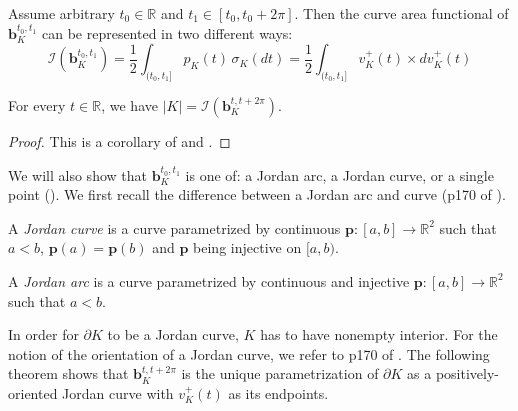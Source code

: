 \begin{theorem}

Assume arbitrary \(t_0 \in \mathbb{R}\) and \(t_1 \in [t_0, t_0 + 2\pi]\). Then the curve area functional of \(\mathbf{b}_K^{t_0, t_1}\) can be represented in two different ways:
\[
\mathcal{I} \left( \mathbf{b}_{K}^{t_0, t_1} \right) = \frac{1}{2} \int_{(t_0, t_1]}p_K(t)\,\sigma_K(dt) = \frac{1}{2} \int_{(t_0, t_1]} v_K^+(t) \times d v_K^+(t)
\]

\label{thm:param-curve-area-functional}
\end{theorem}

\begin{theorem}

For every \(t \in \mathbb{R}\), we have \(|K| = \mathcal{I}\left( \mathbf{b}_K^{t, t + 2\pi} \right)\).

\label{thm:param-positive-area}
\end{theorem}

\begin{proof}
This is a corollary of  and .
\end{proof}

We will also show that \(\mathbf{b}_K^{t_0, t_1}\) is one of: a Jordan arc, a Jordan curve, or a single point (). We first recall the difference between a Jordan arc and curve (p170 of \autocite{apostolMathematicalAnalysisModern}).

\begin{definition}

A \emph{Jordan curve} is a curve parametrized by continuous \(\mathbf{p} : [a, b] \to \mathbb{R}^2\) such that \(a<b\), \(\mathbf{p}(a) = \mathbf{p}(b)\) and \(\mathbf{p}\) being injective on \([a, b)\).

\label{def:jordan-curve}
\end{definition}

\begin{definition}

A \emph{Jordan arc} is a curve parametrized by continuous and injective \(\mathbf{p} : [a, b] \to \mathbb{R}^2\) such that \(a<b\).

\label{def:jordan-arc}
\end{definition}

In order for \(\partial K\) to be a Jordan curve, \(K\) has to have nonempty interior. For the notion of the orientation of a Jordan curve, we refer to p170 of \autocite{apostolMathematicalAnalysisModern}. The following theorem shows that \(\mathbf{b}_K^{t, t + 2\pi}\) is the unique parametrization of \(\partial K\) as a positively-oriented Jordan curve with \(v_K^+(t)\) as its endpoints.

